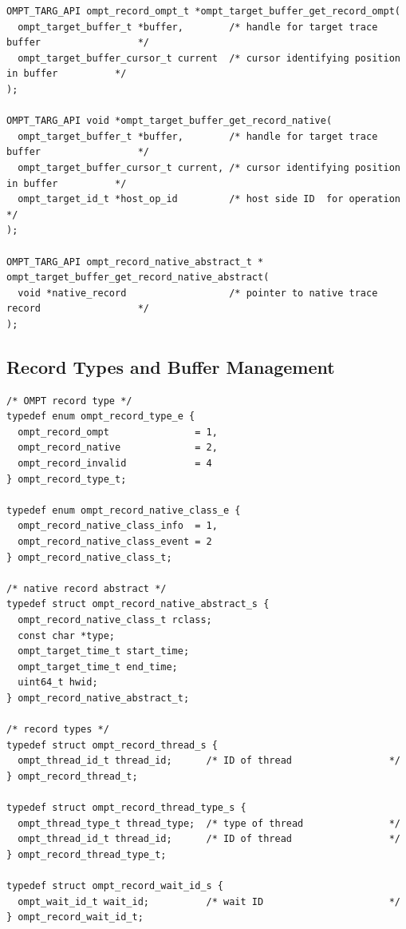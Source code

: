 \documentclass{article}
\begin{document}
{\begin{verbatim}
OMPT_TARG_API ompt_record_ompt_t *ompt_target_buffer_get_record_ompt(
  ompt_target_buffer_t *buffer,        /* handle for target trace buffer                 */
  ompt_target_buffer_cursor_t current  /* cursor identifying position in buffer          */
);
   
OMPT_TARG_API void *ompt_target_buffer_get_record_native(
  ompt_target_buffer_t *buffer,        /* handle for target trace buffer                 */
  ompt_target_buffer_cursor_t current, /* cursor identifying position in buffer          */
  ompt_target_id_t *host_op_id         /* host side ID  for operation                    */
);
  
OMPT_TARG_API ompt_record_native_abstract_t *
ompt_target_buffer_get_record_native_abstract(
  void *native_record                  /* pointer to native trace record                 */
);
\end{verbatim}

\clearpage  
\subsection{Record Types and Buffer Management}
\label{appendix:ompt-records}

\begin{verbatim}
/* OMPT record type */
typedef enum ompt_record_type_e {
  ompt_record_ompt               = 1,
  ompt_record_native             = 2,
  ompt_record_invalid            = 4
} ompt_record_type_t; 

typedef enum ompt_record_native_class_e {
  ompt_record_native_class_info  = 1,
  ompt_record_native_class_event = 2
} ompt_record_native_class_t;

/* native record abstract */
typedef struct ompt_record_native_abstract_s {
  ompt_record_native_class_t rclass;
  const char *type;
  ompt_target_time_t start_time;
  ompt_target_time_t end_time;
  uint64_t hwid;
} ompt_record_native_abstract_t;

/* record types */
typedef struct ompt_record_thread_s {
  ompt_thread_id_t thread_id;      /* ID of thread                 */
} ompt_record_thread_t;

typedef struct ompt_record_thread_type_s {
  ompt_thread_type_t thread_type;  /* type of thread               */
  ompt_thread_id_t thread_id;      /* ID of thread                 */
} ompt_record_thread_type_t;

typedef struct ompt_record_wait_id_s {
  ompt_wait_id_t wait_id;          /* wait ID                      */
} ompt_record_wait_id_t;


\end{verbatim}}
\end{document}
